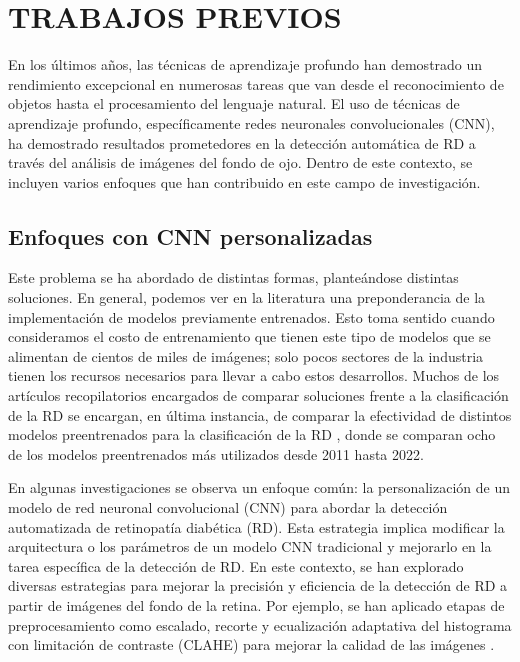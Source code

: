 \section{TRABAJOS PREVIOS}

En los últimos años, las técnicas de aprendizaje profundo han demostrado un rendimiento excepcional en numerosas tareas que van desde el reconocimiento de objetos hasta el procesamiento del lenguaje natural. El uso de técnicas de aprendizaje profundo, específicamente redes neuronales convolucionales (CNN), ha demostrado resultados prometedores en la detección automática de RD a través del análisis de imágenes del fondo de ojo. Dentro de este contexto, se incluyen varios enfoques que han contribuido en este campo de investigación.

\subsection{Enfoques con CNN personalizadas}

Este problema se ha abordado de distintas formas, planteándose distintas soluciones. En general, podemos ver en la literatura una preponderancia de la implementación de modelos previamente entrenados. Esto toma sentido cuando consideramos el costo de entrenamiento que tienen este tipo de modelos que se alimentan de cientos de miles de imágenes; solo pocos sectores de la industria tienen los recursos necesarios para llevar a cabo estos desarrollos. Muchos de los artículos recopilatorios encargados de comparar soluciones frente a la clasificación de la RD se encargan, en última instancia, de comparar la efectividad de distintos modelos preentrenados para la clasificación de la RD , donde se comparan ocho de los modelos preentrenados más utilizados desde 2011 hasta 2022.

En algunas investigaciones se observa un enfoque común: la personalización de un modelo de red neuronal convolucional (CNN) para abordar la detección automatizada de retinopatía diabética (RD). Esta estrategia implica modificar la arquitectura o los parámetros de un modelo CNN tradicional y mejorarlo en la tarea específica de la detección de RD. En este contexto, se han explorado diversas estrategias para mejorar la precisión y eficiencia de la detección de RD a partir de imágenes del fondo de la retina. Por ejemplo, se han aplicado etapas de preprocesamiento como escalado, recorte y ecualización adaptativa del histograma con limitación de contraste (CLAHE) para mejorar la calidad de las imágenes .


